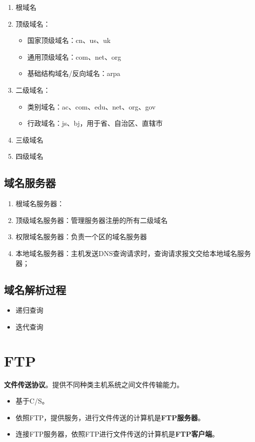 \begin{enumerate}
    \item 根域名
    \item 顶级域名：\begin{itemize}
        \item 国家顶级域名：cn、us、uk
        \item 通用顶级域名：com、net、org
        \item 基础结构域名/反向域名：arpa
    \end{itemize}
    \item 二级域名：\begin{itemize}
        \item 类别域名：ac、com、edu、net、org、gov
        \item 行政域名：js、bj，用于省、自治区、直辖市
    \end{itemize}
    \item 三级域名
    \item 四级域名
\end{enumerate}


\subsection{域名服务器}
\begin{enumerate}
    \item 根域名服务器：
    \item 顶级域名服务器：管理服务器注册的所有二级域名
    \item 权限域名服务器：负责一个区的域名服务器
    \item 本地域名服务器：主机发送DNS查询请求时，查询请求报文交给本地域名服务器；
\end{enumerate}


\subsection{域名解析过程}

\begin{itemize}
    \item 递归查询
    \item 迭代查询
\end{itemize}


\section{FTP}
\textbf{文件传送协议}。提供不同种类主机系统之间文件传输能力。
\begin{itemize}
    \item 基于C/S。
    \item 依照FTP，提供服务，进行文件传送的计算机是\textbf{FTP服务器}。
    \item 连接FTP服务器，依照FTP进行文件传送的计算机是\textbf{FTP客户端}。
\end{itemize}

